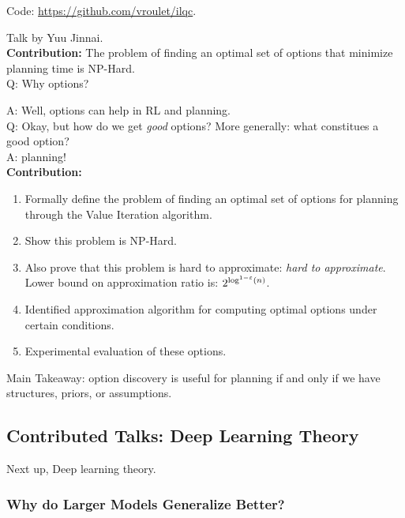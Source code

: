 Code: \url{https://github.com/vroulet/ilqc}.




Talk by Yuu Jinnai. \\

{\bf Contribution:} The problem of finding an optimal set of options that minimize planning time is NP-Hard. \\

Q: Why options?

A: Well, options can help in RL and planning. \\

Q: Okay, but how do we get {\it good} options? More generally: what constitues a good option? \\

A: planning! \\

{\bf Contribution:}
\begin{enumerate}
    \item Formally define the problem of finding an optimal set of options for planning through the Value Iteration algorithm.
    \item Show this problem is NP-Hard.
    \item Also prove that this problem is hard to approximate: {\it hard to approximate}. Lower bound on approximation ratio is: $2^{\log^{1-\varepsilon}(n)}$.
    \item Identified approximation algorithm for computing optimal options under certain conditions.
    \item Experimental evaluation of these options.
\end{enumerate}

Main Takeaway: option discovery is useful for planning if and only if we have structures, priors, or assumptions.

\spacerule


\subsection{Contributed Talks: Deep Learning Theory}

Next up, Deep learning theory.

\subsubsection{Why do Larger Models Generalize Better?~\cite{brutzkus2019larger}}

